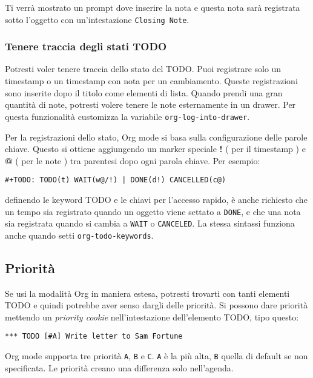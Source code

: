 \documentclass[11pt]{article}
\begin{document}
Ti verrà mostrato un prompt dove inserire la nota e questa nota sarà
registrata sotto l'oggetto con un'intestazione \texttt{Closing Note}.

\subsubsection*{Tenere traccia degli stati TODO}
\label{sec:org3895a1f}
Potresti voler tenere traccia dello stato del TODO. Puoi registrare
solo un timestamp o un timestamp con nota per un cambiamento. Queste
registrazioni sono inserite dopo il titolo come elementi di
lista. Quando prendi una gran quantità di note, potresti volere tenere
le note esternamente in un drawer. Per questa funzionalità customizza
la variabile \texttt{org-log-into-drawer}.

Per la registrazioni dello stato, Org mode si basa sulla
configurazione delle parole chiave. Questo si ottiene aggiungendo un
marker speciale \textbf{!} ( per il timestamp ) e \textbf{@} ( per le note ) tra
parentesi dopo ogni parola chiave. Per esempio:

\begin{verbatim}
#+TODO: TODO(t) WAIT(w@/!) | DONE(d!) CANCELLED(c@)
\end{verbatim}


definendo le keyword TODO e le chiavi per l'accesso rapido, è anche
richiesto che un tempo sia registrato quando un oggetto viene settato
a \texttt{DONE}, e che una nota sia registrata quando si cambia a \texttt{WAIT} o
\texttt{CANCELED}. La stessa sintassi funziona anche quando setti
\texttt{org-todo-keywords}.

\subsection{Priorità}
\label{sec:orgaf03c77}
Se usi la modalità Org in maniera estesa, potresti trovarti con tanti
elementi TODO e quindi potrebbe aver senso dargli delle priorità. Si
possono dare priorità mettendo un \emph{priority cookie} nell'intestazione
dell'elemento TODO, tipo questo:

\begin{verbatim}
*** TODO [#A] Write letter to Sam Fortune
\end{verbatim}


Org mode supporta tre priorità \texttt{A}, \texttt{B} e \texttt{C}. \texttt{A} è la più alta, \texttt{B}
quella di default se non specificata. Le priorità creano una
differenza solo nell'agenda.
\end{document}
